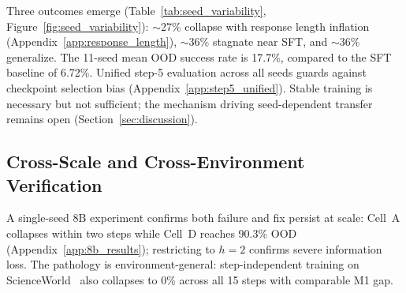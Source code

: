 Three outcomes emerge (Table~\ref{tab:seed_variability}, Figure~\ref{fig:seed_variability}): ${\sim}$27\% collapse with response length inflation (Appendix~\ref{app:response_length}), ${\sim}$36\% stagnate near SFT, and ${\sim}$36\% generalize. The 11-seed mean OOD success rate is 17.7\%, compared to the SFT baseline of 6.72\%. Unified step-5 evaluation across all seeds guards against checkpoint selection bias (Appendix~\ref{app:step5_unified}). Stable training is necessary but not sufficient; the mechanism driving seed-dependent transfer remains open (Section~\ref{sec:discussion}).

\subsection{Cross-Scale and Cross-Environment Verification}
\label{sec:cross_scale}

A single-seed 8B experiment confirms both failure and fix persist at scale: Cell~A collapses within two steps while Cell~D reaches 90.3\% OOD (Appendix~\ref{app:8b_results}); restricting to $h{=}2$ confirms severe information loss. The pathology is environment-general: step-independent training on ScienceWorld~\citep{wang2022scienceworld} also collapses to 0\% across all 15 steps with comparable M1 gap.
